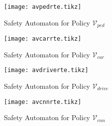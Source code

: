 \begin{figure}[t]
	\centering
	\texttt{[image: avpedrte.tikz]}
	\caption{Safety Automaton for Policy $\mathcal{V}_{ped}$\label{fig:avpedrte}}
\end{figure}
\begin{figure}[t]
	\centering
	\texttt{[image: avcarrte.tikz]}
	\caption{Safety Automaton for Policy $\mathcal{V}_{car}$\label{fig:avcarrte}}
\end{figure}
\begin{figure}[t]
	\centering
	\texttt{[image: avdriverte.tikz]}
	\caption{Safety Automaton for Policy $\mathcal{V}_{drive}$\label{fig:avdriverte}}
\end{figure}
\begin{figure}[t]
	\centering
	\texttt{[image: avcnnrte.tikz]}
	\caption{Safety Automaton for Policy $\mathcal{V}_{cnn}$\label{fig:avcnnrte}}
\end{figure}












